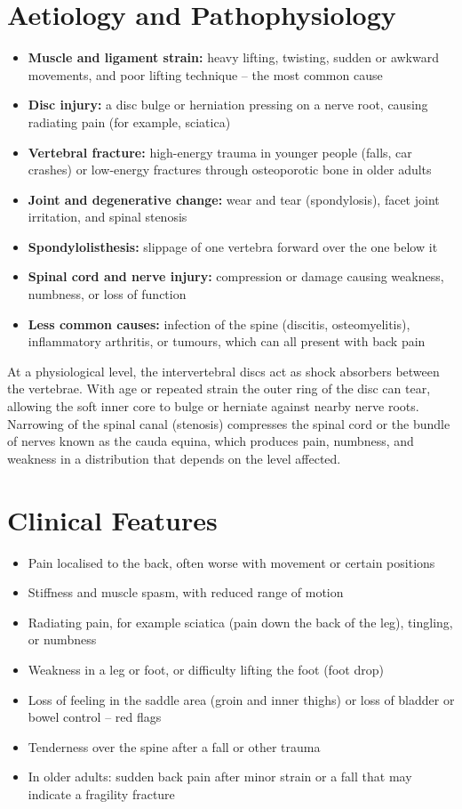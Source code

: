 \section*{Aetiology and Pathophysiology}
\begin{itemize}
    \item \textbf{Muscle and ligament strain:} heavy lifting, twisting, sudden or awkward movements, and poor lifting technique -- the most common cause
    \item \textbf{Disc injury:} a disc bulge or herniation pressing on a nerve root, causing radiating pain (for example, sciatica)
    \item \textbf{Vertebral fracture:} high-energy trauma in younger people (falls, car crashes) or low-energy fractures through osteoporotic bone in older adults
    \item \textbf{Joint and degenerative change:} wear and tear (spondylosis), facet joint irritation, and spinal stenosis
    \item \textbf{Spondylolisthesis:} slippage of one vertebra forward over the one below it
    \item \textbf{Spinal cord and nerve injury:} compression or damage causing weakness, numbness, or loss of function
    \item \textbf{Less common causes:} infection of the spine (discitis, osteomyelitis), inflammatory arthritis, or tumours, which can all present with back pain
\end{itemize}

At a physiological level, the intervertebral discs act as shock absorbers between the vertebrae. With age or repeated strain the outer ring of the disc can tear, allowing the soft inner core to bulge or herniate against nearby nerve roots. Narrowing of the spinal canal (stenosis) compresses the spinal cord or the bundle of nerves known as the cauda equina, which produces pain, numbness, and weakness in a distribution that depends on the level affected.

\section*{Clinical Features}
\begin{itemize}
    \item Pain localised to the back, often worse with movement or certain positions
    \item Stiffness and muscle spasm, with reduced range of motion
    \item Radiating pain, for example sciatica (pain down the back of the leg), tingling, or numbness
    \item Weakness in a leg or foot, or difficulty lifting the foot (foot drop)
    \item Loss of feeling in the saddle area (groin and inner thighs) or loss of bladder or bowel control -- red flags
    \item Tenderness over the spine after a fall or other trauma
    \item In older adults: sudden back pain after minor strain or a fall that may indicate a fragility fracture
\end{itemize}

